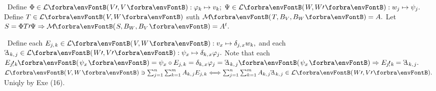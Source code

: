 

\par
{}\BulletPointX{}\,\,\,Define $\Phi\in\Lm{V\apostrophe,V}:\varphi_k\mapsto v_k;\;\Psi\in\Lm{W,W\apostrophe}:w_j\mapsto\psi_j.$\TextB{}
Define $T\in\Lm{V,W}$ suth $\Mt{T,B_V,B_W}=A.$ Let $S=\Phi T\apostrophe\Psi\Rightarrow\Mt{S,B_W,B_V}=A^t.$\vspace{2pt}\par
{}\BulletPointX{}\,\,\,Define each $E_{j,\;\!k}\in\Lm{V,W}:v_x\mapsto\delta_{j,\;\!x}w_k,$ and each $\reflectbox{\textit{E}}{_{k,\;\!j}}\in\Lm{W\apostrophe,V\apostrophe}:\psi_x\mapsto\delta_{k,\;\!x}\varphi_j.$\TextB{}
Note that each $E_{j,\;\!k}\!\!\upapostrophe\,\,\Par{\psi_x}=\psi_x\circ E_{j,\;\!k}=\delta_{k,\;\!x}\varphi_j=\reflectbox{\textit{E}}{_{k,\;\!j}}\Par{\psi_x}\Rightarrow E_{j,\;\!k}\!\!\upapostrophe\,\,=\reflectbox{\textit{E}}{_{k,\;\!j}}.$\vspace{1pt}\TextB{}
$\Lm{V,W}\ni \sum_{j=1}^n\sum_{k=1}^mA_{k,\;\!j}E_{j,\;\!k}\Longleftrightarrow\sum_{j=1}^n\sum_{k=1}^mA_{k,\;\!j}\reflectbox{\textit{E}}{_{k,\;\!j}}\in\Lm{W\apostrophe,V\apostrophe}.$ Uniqly by Exe (16).%
\SepLine

